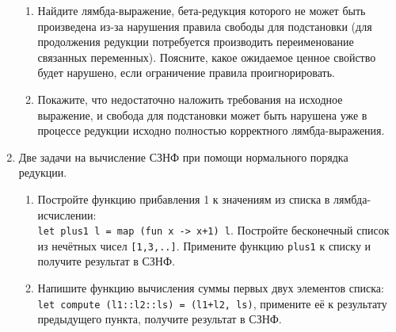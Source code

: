 \documentclass[10pt,a4paper,oneside]{article}
\begin{document}
\begin{enumerate}
\begin{enumerate}
\item Найдите лямбда-выражение, бета-редукция которого не может быть произведена из-за нарушения
правила свободы для подстановки (для продолжения редукции потребуется производить переименование
связанных переменных). Поясните, какое ожидаемое ценное свойство будет нарушено, если ограничение
правила проигнорировать.
\item Покажите, что недостаточно наложить требования на исходное выражение, и свобода для подстановки
может быть нарушена уже в процессе редукции исходно полностью корректного лямбда-выражения.
\end{enumerate}

\begin{comment}
\item Будем говорить, что выражение $A$ находится в \emph{слабой заголовочной нормальной форме} (WHNF),
если оно не имеет вид $A \equiv (\lambda x.P)\ Q$ (то есть, самый верхний терм его не является редексом).
Выражение находится в \emph{заголовочной нормальной форме} (HNF), когда его верхний терм --- не редекс и не лямбда-абстракция
с бета-редексами в теле.
\begin{enumerate}
\item Приведите нормальным порядком редукции выражение $2\ 2$ в СЗНФ.
\item Приведите нормальным порядком редукции выражение $Y\ (\lambda f.\lambda x.(IsZero\ x)\ 1\ (x \cdot f(x-1)))\ 3$ в СЗНФ.
\item Верно ли, что <<нормальность>> формы выражения может в процессе редукции только усиливаться
(никакая --- слабая заголовочная Н.Ф. --- заголовочная Н.Ф. --- нормальная форма)?
\end{enumerate}
\end{comment}

\item Две задачи на вычисление СЗНФ при помощи нормального порядка редукции.

\begin{enumerate}
\item Постройте функцию прибавления 1 к значениям из списка в лямбда-исчислении:\\ \verb!let plus1 l = map (fun x -> x+1) l!.
Постройте бесконечный список из нечётных чисел \verb![1,3,..]!. Примените функцию \verb!plus1! к списку и получите результат
в СЗНФ.

\item Напишите функцию вычисления суммы первых двух элементов списка:\\
\verb!let compute (l1::l2::ls) = (l1+l2, ls)!, примените её к результату предыдущего пункта,
получите результат в СЗНФ.
\end{enumerate}


\end{enumerate}
\end{document}
